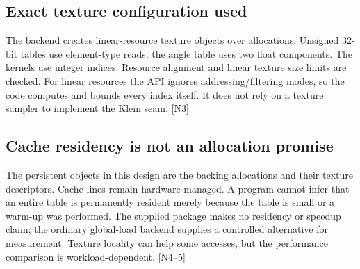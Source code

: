 \documentclass[11pt,a4paper]{article}
\newcommand{\ext}[1]{\textcolor{muted}{[N#1]}}
\newcommand{\code}[1]{\texttt{\detokenize{#1}}}
\begin{document}
\begin{center}
\end{center}

\subsection{Exact texture configuration used}
The backend creates linear-resource texture objects over \code{cudaMalloc} allocations. Unsigned 32-bit tables use element-type reads; the angle table uses two float components. The kernels use integer \code{tex1Dfetch} indices. Resource alignment and linear texture size limits are checked. For linear resources the API ignores addressing/filtering modes, so the code computes and bounds every index itself. It does not rely on a texture sampler to implement the Klein seam. \ext{3}

\subsection{Cache residency is not an allocation promise}
The persistent objects in this design are the backing allocations and their texture descriptors. Cache lines remain hardware-managed. A program cannot infer that an entire table is permanently resident merely because the table is small or a warm-up was performed. The supplied package makes no residency or speedup claim; the ordinary global-load backend supplies a controlled alternative for measurement. Texture locality can help some accesses, but the performance comparison is workload-dependent. \ext{4--5}
\end{document}
